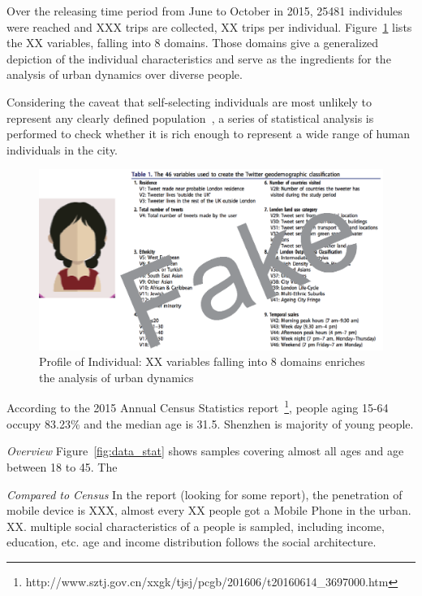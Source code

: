 Over the releasing time period from June to October in 2015, 25481 individules were reached and XXX trips are collected, XX trips per individual. Figure~\ref{fig:data_over} lists the XX variables, falling into 8 domains. Those domains give a generalized depiction of the individual characteristics and serve as the ingredients for the analysis of urban dynamics over diverse people. 

Considering the caveat that self-selecting individuals are most unlikely to represent any clearly defined population~\cite{Longley2015}, a series of statistical analysis is performed to check whether it is rich enough to represent a wide range of human individuals in the city.


\begin{figure}[htb!]
 \centering %
 \includegraphics[width=\columnwidth]{pictures/data_over}
 \caption{Profile of Individual: XX variables falling into 8 domains enriches the analysis of urban dynamics}
 \label{fig:data_over}
\end{figure}

According to the 2015 Annual Census Statistics report~\footnote{http://www.sztj.gov.cn/xxgk/tjsj/pcgb/201606/t20160614\_3697000.htm}, people aging 15-64 occupy 83.23\% and the median age is 31.5. Shenzhen is majority of young people. 

\textit{Overview} Figure~\ref{fig:data_stat} shows samples covering almost all ages and age between 18 to 45. The 

\textit{Compared to Census} In the report (looking for some report), the penetration of mobile device is XXX, almost every XX people got a Mobile Phone in the urban. XX.  multiple social characteristics of a people is sampled, including income, education, etc. age and income distribution follows the social architecture. 


